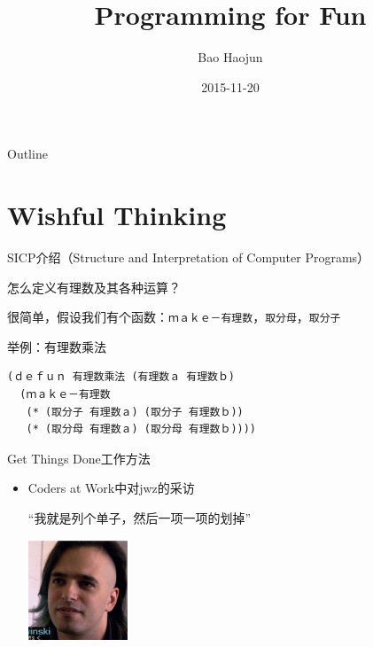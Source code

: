 \documentclass[presentation,dvipdfmx,CJKbookmarks]{beamer}
\author{Bao Haojun}
\date{2015-11-20}
\title{Programming for Fun}
\begin{document}
\begin{CJK*}{UTF8}{simsun}

\maketitle
\begin{frame}{Outline}
\tableofcontents
\end{frame}

\CJKtilde

\section{Wishful Thinking}
\label{sec:org6208ac9}

\begin{frame}[fragile,label={sec:org20aebf1}]{SICP\thinspace 介绍（Structure and Interpretation of Computer Programs）}
 \begin{block}{怎么定义有理数及其各种运算？}
\end{block}
\begin{block}{很简单，假设我们有\thinspace 个函数：\texttt{ｍａｋｅ－有理数}，\texttt{取分母}，\texttt{取分子}}
\end{block}
\begin{block}{举例：有理数乘法}
\begin{verbatim}
(ｄｅｆｕｎ 有理数乘法 (有理数ａ 有理数ｂ)
  (ｍａｋｅ－有理数
   (* (取分子 有理数ａ) (取分子 有理数ｂ))
   (* (取分母 有理数ａ) (取分母 有理数ｂ))))
\end{verbatim}
\end{block}
\end{frame}

\begin{frame}[label={sec:orgc429e7c}]{Get Things Done\thinspace 工作方法}
\begin{itemize}
\item Coders at Work\thinspace 中对\thinspace jwz\thinspace 的采访

“我就是列个单子，然后一项一项的划掉”

\begin{center}
\includegraphics[width=3cm]{./jwz.ps}
\end{center}


\end{itemize}
\end{frame}
\end{CJK*}
\end{document}
